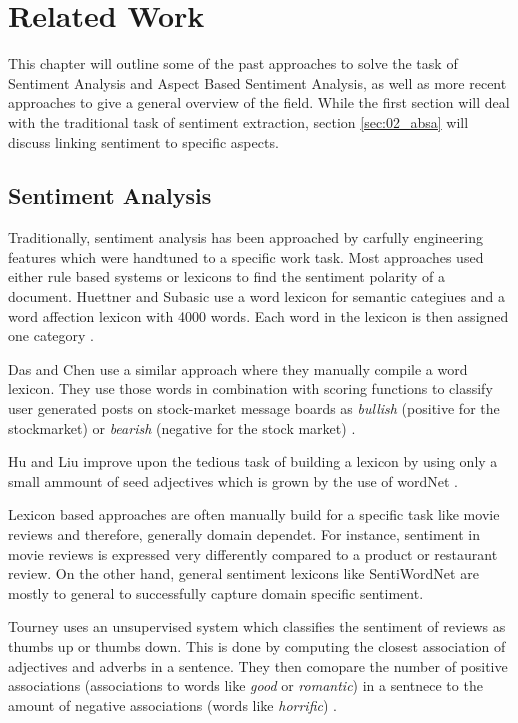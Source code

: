 \chapter{Related Work}
\label{ch:relWork}

This chapter will outline some of the past approaches to solve the task of Sentiment Analysis and Aspect Based Sentiment Analysis, as well as more recent approaches to give a general overview of the field. While the first section will deal with the traditional task of sentiment extraction, section \ref{sec:02_absa} will discuss linking sentiment to specific aspects.

\section{Sentiment Analysis}

Traditionally, sentiment analysis has been approached by carfully engineering features which were handtuned to a specific work task. Most approaches used either rule based systems \cite{Popescu2005} or lexicons to find the sentiment polarity of a document. Huettner and Subasic use a word lexicon for semantic categiues and a word affection lexicon with 4000 words. Each word in the lexicon is then assigned one category \cite{Huettner2000}. 

Das and Chen use a similar approach where they manually compile a word lexicon. They use those words in combination with scoring functions to classify user generated posts on stock-market message boards as \textit{bullish} {(positive for the stockmarket)} or \textit{bearish} {(negative for the stock market)} \cite{Das2007}.

Hu and Liu improve upon the tedious task of building a lexicon by using only a small ammount of seed adjectives which is grown by the use of wordNet \cite{Hu2004}.
\medskip

Lexicon based approaches are often manually build for a specific task like movie reviews \cite{Tong2001, Thet2010} and therefore, generally domain dependet. For instance, sentiment in movie reviews is expressed very differently compared to a product or restaurant review. On the other hand, general sentiment lexicons like SentiWordNet \cite{Baccianella2010} are mostly to general to successfully capture domain specific sentiment.
\medskip

Tourney uses an unsupervised system which classifies the sentiment of reviews as thumbs up or thumbs down. This is done by computing the closest association of adjectives and adverbs in a sentence. They then comopare the number of positive associations {(associations to words like \textit{good} or \textit{romantic})} in a sentnece to the amount of negative associations {(words like \textit{horrific})} \cite{Turney2007}.
\medskip

